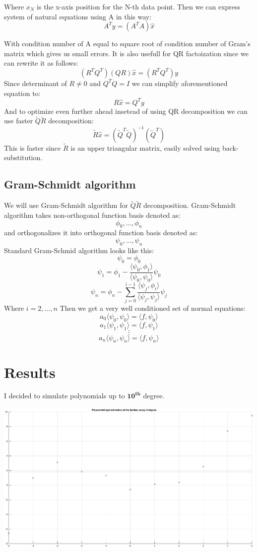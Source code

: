 \documentclass[12pt]{report}
\begin{document}
Where $x_N$ is the x-axis position for the N-th data point. Then we can express system of natural equations using A in this way:
\[ A^Ty = (A^TA)\hat{x} \]

With condition number of A equal to square root of condition number of Gram's matrix which gives us small errors. It is also usefull for QR factoization since we can rewrite it as follows:
\[ (R^TQ^T)(QR)\hat{x} = (R^TQ^T)y \]
Since determinant of $R \neq 0$ and $Q^TQ = I$ we can simplify aforementioned equation to:
\[ R\hat{x} = Q^Ty \]
And to optimize even further ahead insetead of using QR decomposition we can use faster $\tilde{Q}\tilde{R}$ decomposition:
\[ \tilde{R}\hat{x} = (\tilde{Q}^T\tilde{Q})^{-1}(\tilde{Q}^T) \]
This is faster since $\tilde{R}$ is an upper triangular matrix, easily solved using back-substitution.

\subsection{Gram-Schmidt algorithm}
We will use Gram-Schmidt algorithm for $\tilde{Q}\tilde{R}$ decomposition.
Gram-Schmidt algorithm takes non-orthogonal function basis denoted as:
\[ \phi_0, \dots, \phi_n \]
and orthogonalizes it into orthogonal function basis denoted as:
\[ \psi_0, \dots, \psi_n \]
Standard Gram-Schmid algorithm looks like this:
\[ \psi_0 = \phi_0 \]
\[ \psi_1 = \phi_1 - \frac{\langle \psi_0, \phi_1 \rangle}{\langle \psi_0, \psi_0 \rangle} \psi_0 \]
\[ \psi_n = \phi_n - \sum_{j = 0}^{i-1}  \frac{\langle \psi_j, \phi_i \rangle}{\langle \psi_j, \psi_j \rangle} \psi_j \]
Where $ i = 2, \dots, n $
Then we get a very well conditioned set of normal equations:
\[ a_0\langle \psi_0, \psi_0 \rangle = \langle f, \psi_0 \rangle \]
\[ a_1\langle \psi_1, \psi_1 \rangle = \langle f, \psi_1 \rangle \]
\[ \vdots \]
\[ a_n\langle \psi_n, \psi_n \rangle = \langle f, \psi_n \rangle \]

\section{Results}

I decided to simulate polynomials up to $\mathbf{10^{th}}$ degree.

\begin{center}
   \includegraphics[scale=0.25]{10.eps}
\end{center}
\end{document}
